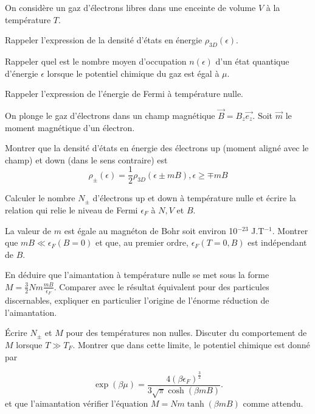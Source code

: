 On considère un gaz d'électrons libres dans une enceinte de volume $V$ à la température $T$.

\question
Rappeler l'expression de la densité d'états en énergie $\rho_{3D}(\epsilon)$.

\question
Rappeler quel est le nombre moyen d'occupation $n(\epsilon)$ d'un état quantique d'énergie $\epsilon$ lorsque le potentiel chimique du gaz est égal à $\mu$.

\question
Rappeler l'expression de l'énergie de Fermi à température nulle.

\medskip

On plonge le gaz d'électrons dans un champ magnétique $\vec{B}=B_z\vec{e_z}$. Soit $\vec{m}$ le moment magnétique d'un électron.

\question
Montrer que la densité d'états en énergie des électrons up (moment aligné avec le champ) et down (dans le sens contraire) est
$$
\rho_\pm(\epsilon)=\frac{1}{2}\rho_{3D}(\epsilon \pm mB), \epsilon \geq \mp mB
$$

\question
Calculer le nombre $N_\pm$ d'électrons up et down à température nulle et écrire la relation qui relie le niveau de Fermi $\epsilon_F$ à $N, V$ et $B$.

\question
La valeur de $m$ est égale au  magnéton de Bohr soit environ 10$^{-23}$ J.T$^{-1}$. Montrer que $mB \ll \epsilon_F(B=0)$ et que, au premier ordre, $\epsilon_F(T=0,B)$ est indépendant de $B$.

\question
En déduire que l'aimantation à température nulle se met sous la forme $M=\frac{3}{2} N m \frac{mB}{\epsilon_F}$. Comparer avec le résultat équivalent pour des particules discernables, expliquer en particulier l'origine de l'énorme réduction de l'aimantation.

\question
\'Ecrire $N_\pm$ et $M$ pour des températures non nulles. Discuter du comportement de $M$ lorsque $T\gg T_F$. Montrer que dans cette limite, le potentiel chimique est donné par

$$
\exp (\beta \mu)=\frac{4(\beta \epsilon_F)^{\frac{3}{2}}}{3\sqrt{\pi}\cosh(\beta m B)}. \nonumber
$$
et que l'aimantation vérifier l'équation $M= Nm\tanh(\beta m B)$ comme attendu.

